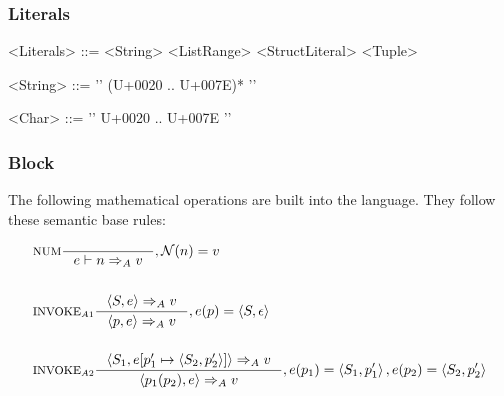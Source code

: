 \subsubsection{Literals}

\begin{grammar}
<Literals> ::= <String>
 \alt <ListRange>
 \alt <StructLiteral>
 \alt <Tuple>

<String> ::= '\textquotedbl' (U+0020 .. U+007E)* '\textquotedbl'

<Char> ::= '\textquotesingle' U+0020 .. U+007E '\textquotesingle'
\end{grammar}

\subsubsection{Block}
The following mathematical operations are built into the language. They follow these semantic base rules:

\begin{align*}
&\inference[NUM]{}
                  {e \vdash n \Rightarrow_A v}
                  {, \mathcal{N}(n) = v}
\\\\
&\inference[$\text{INVOKE}_{A1}$]{\Braket{S,e} \Rightarrow_A v}
                  {\Braket{p,e} \Rightarrow_A v}
                  {,e(p) = \Braket{S,\epsilon}}
\\\\
&\inference[$\text{INVOKE}_{A2}$]{\Braket{S_1,e[p_1' \mapsto \Braket{S_2,p_2'}]} \Rightarrow_A v}
                  {\Braket{p_1(p_2),e} \Rightarrow_A v}
                  {,e(p_1) = \Braket{S_1,p_1'}, e(p_2) = \Braket{S_2,p_2'}}
\\\\
\end{align*}


